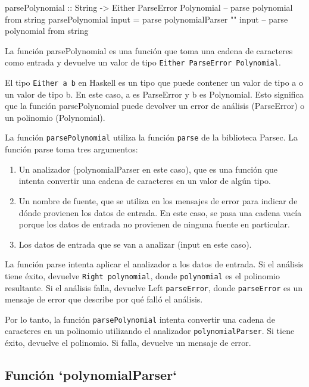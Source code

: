 \documentclass{article}
\begin{document}
\begin{haskell}
  parsePolynomial :: String -> Either ParseError Polynomial -- parse polynomial from string
  parsePolynomial input = parse polynomialParser "" input -- parse polynomial from string
\end{haskell}
La función \texttt{}{parsePolynomial} es una función que toma una cadena de caracteres como entrada y devuelve un valor de tipo \texttt{Either ParseError Polynomial}.

\begin{note}
El tipo \texttt{Either a b} en Haskell es un tipo que puede contener un valor de tipo a o un valor de tipo b. En este caso, a es ParseError y b es Polynomial. Esto significa que la función parsePolynomial puede devolver un error de análisis (ParseError) o un polinomio (Polynomial).
\end{note}

La función \texttt{parsePolynomial} utiliza la función \texttt{parse} de la biblioteca Parsec. La función parse toma tres argumentos:
\begin{enumerate}
  \item Un analizador (polynomialParser en este caso), que es una función que intenta convertir una cadena de caracteres en un valor de algún tipo. 
  \item Un nombre de fuente, que se utiliza en los mensajes de error para indicar de dónde provienen los datos de entrada. En este caso, se pasa una cadena vacía porque los datos de entrada no provienen de ninguna fuente en particular.
  \item Los datos de entrada que se van a analizar (input en este caso).
\end{enumerate}

La función parse intenta aplicar el analizador a los datos de entrada. Si el análisis tiene éxito, devuelve \texttt{Right polynomial}, donde \texttt{polynomial} es el polinomio resultante. Si el análisis falla, devuelve Left \texttt{parseError}, donde \texttt{parseError} es un mensaje de error que describe por qué falló el análisis.

Por lo tanto, la función \texttt{parsePolynomial} intenta convertir una cadena de caracteres en un polinomio utilizando el analizador \texttt{polynomialParser}. Si tiene éxito, devuelve el polinomio. Si falla, devuelve un mensaje de error.

\subsection{Función `polynomialParser`}
\end{document}
